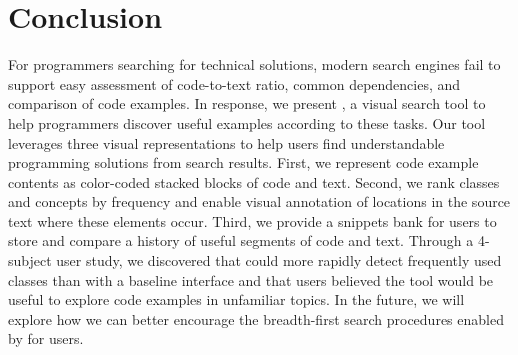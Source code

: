 \section{Conclusion}

For programmers searching for technical solutions, modern search engines fail to support easy assessment of code-to-text ratio, common dependencies, and comparison of code examples.
In response, we present \systemname{}, a visual search tool to help programmers discover useful examples according to these tasks.
Our tool leverages three visual representations to help users find understandable programming solutions from search results.
First, we represent code example contents as color-coded stacked blocks of code and text.
Second, we rank classes and concepts by frequency and enable visual annotation of locations in the source text where these elements occur.
Third, we provide a snippets bank for users to store and compare a history of useful segments of code and text.
Through a 4-subject user study, we discovered that could more rapidly detect frequently used classes than with a baseline interface and that users believed the tool would be useful to explore code examples in unfamiliar topics.
In the future, we will explore how we can better encourage the breadth-first search procedures enabled by \systemname{} for users.